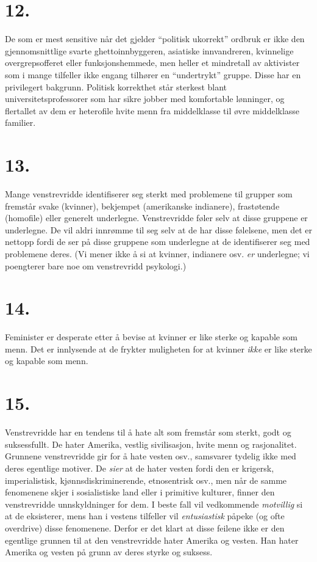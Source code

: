 \documentclass[oneside]{book}
\begin{document}
\section*{12.}
De som er mest sensitive når det gjelder ``politisk ukorrekt'' ordbruk er ikke
den gjennomsnittlige svarte ghettoinnbyggeren, asiatiske innvandreren,
kvinnelige overgrepsofferet eller funksjonshemmede, men heller et mindretall av
aktivister som i mange tilfeller ikke engang tilhører en ``undertrykt'' gruppe.
Disse har en privilegert bakgrunn. Politisk korrekthet står sterkest blant
universitetsprofessorer som har sikre jobber med komfortable lønninger, og
flertallet av dem er heterofile hvite menn fra middelklasse til øvre
middelklasse familier.

\section*{13.}
Mange venstrevridde identifiserer seg sterkt med problemene til grupper som
fremstår svake (kvinner), bekjempet (amerikanske indianere), frastøtende
(homofile) eller generelt underlegne. Venstrevridde føler selv at disse
gruppene er underlegne. De vil aldri innrømme til seg selv at de har disse
følelsene, men det er nettopp fordi de ser på disse gruppene som underlegne at
de identifiserer seg med problemene deres. (Vi mener ikke å si at kvinner,
indianere osv. \emph{er} underlegne; vi poengterer bare noe om venstrevridd
psykologi.)

\section*{14.}
Feminister er desperate etter å bevise at kvinner er like sterke og kapable som
menn. Det er innlysende at de frykter muligheten for at kvinner {\em ikke} er
like sterke og kapable som menn.

\section*{15.}
Venstrevridde har en tendens til å hate alt som fremstår som sterkt, godt og
suksessfullt. De hater Amerika, vestlig sivilisasjon, hvite menn og
rasjonalitet. Grunnene venstrevridde gir for å hate vesten osv., samsvarer
tydelig ikke med deres egentlige motiver. De {\em sier} at de hater vesten
fordi den er krigersk, imperialistisk, kjønnsdiskriminerende, etnosentrisk
osv., men når de samme fenomenene skjer i sosialistiske land eller i primitive
kulturer, finner den venstrevridde unnskyldninger for dem. I beste fall vil
vedkommende {\em motvillig} si at de eksisterer, mens han i vestens tilfeller
vil {\em entusiastisk} påpeke (og ofte overdrive) disse fenomenene. Derfor er
det klart at disse feilene ikke er den egentlige grunnen til at den
venstrevridde hater Amerika og vesten. Han hater Amerika og vesten på grunn av
deres styrke og suksess.
\end{document}
